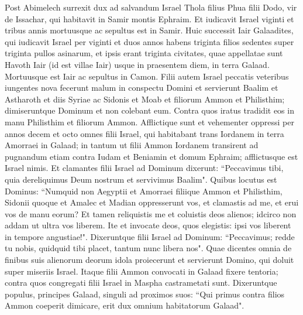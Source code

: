 \begin{biblechapter}  
\verse Post Abimelech surrexit dux ad salvandum Israel Thola filius Phua filii Dodo, vir de Issachar, qui habitavit in Samir montis Ephraim. 
\verse Et iudicavit Israel viginti et tribus annis mortuusque ac sepultus est in Samir. 
\verse Huic successit Iair Galaadites, qui iudicavit Israel per viginti et duos annos 
\verse habens triginta filios sedentes super triginta pullos asinarum, et ipsis erant triginta civitates, quae appellatae sunt Havoth Iair (id est villae Iair) usque in praesentem diem, in terra Galaad. 
\verse Mortuusque est Iair ac sepultus in Camon. 
\verse Filii autem Israel peccatis veteribus iungentes nova fecerunt malum in conspectu Domini et servierunt Baalim et Astharoth et diis Syriae ac Sidonis et Moab et filiorum Ammon et Philisthim; dimiseruntque Dominum et non colebant eum. 
\verse Contra quos iratus tradidit eos in manu Philisthim et filiorum Ammon.  
\verse Afflictique sunt et vehementer oppressi per annos decem et octo omnes filii Israel, qui habitabant trans Iordanem in terra Amorraei in Galaad; 
\verse in tantum ut filii Ammon Iordanem transirent ad pugnandum etiam contra Iudam et Beniamin et domum Ephraim; afflictusque est Israel nimis. 
\verse Et clamantes filii Israel ad Dominum dixerunt: “Peccavimus tibi, quia dereliquimus Deum nostrum et servivimus Baalim". 
\verse Quibus locutus est Dominus: “Numquid non Aegyptii et Amorraei filiique Ammon et Philisthim, 
\verse Sidonii quoque et Amalec et Madian oppresserunt vos, et clamastis ad me, et erui vos de manu eorum? 
\verse Et tamen reliquistis me et coluistis deos alienos; idcirco non addam ut ultra vos liberem. 
\verse Ite et invocate deos, quos elegistis: ipsi vos liberent in tempore angustiae!". 
\verse Dixeruntque filii Israel ad Dominum: “Peccavimus; redde tu nobis, quidquid tibi placet, tantum nunc libera nos". 
\verse Quae dicentes omnia de finibus suis alienorum deorum idola proiecerunt et servierunt Domino, qui doluit super miseriis Israel. 
\verse Itaque filii Ammon convocati in Galaad fixere tentoria; contra quos congregati filii Israel in Maspha castrametati sunt. 
\verse Dixeruntque populus, principes Galaad, singuli ad proximos suos: “Qui primus contra filios Ammon coeperit dimicare, erit dux omnium habitatorum Galaad". 
\end{biblechapter}


